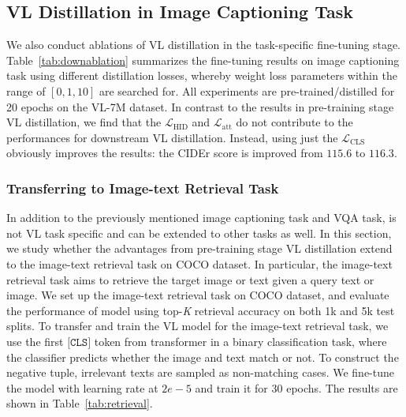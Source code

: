 \subsection*{VL Distillation in Image Captioning Task}
We also conduct ablations of VL distillation in the task-specific fine-tuning stage. Table~\ref{tab:downablation} summarizes the fine-tuning results on image captioning task using different distillation losses, whereby weight loss parameters within the range of $[0, 1, 10]$ are searched for. All experiments are pre-trained/distilled for 20 epochs on the VL-7M dataset. In contrast to the results in pre-training stage VL distillation, we find that the $\mathcal{L}_\text{HID}$ and $\mathcal{L}_\text{att}$ do not contribute to the performances for downstream VL distillation. Instead, using just the $\mathcal{L}_\text{CLS}$ obviously improves the results: the CIDEr score is improved from $115.6$ to $116.3$.



\subsubsection*{Transferring to Image-text Retrieval Task}
In addition to the previously mentioned image captioning task and VQA task, \distillvlm is not VL task specific and can be extended to other tasks as well. In this section, we study whether the advantages from pre-training stage VL distillation extend to the image-text retrieval task on COCO dataset. In particular, the image-text retrieval task aims to retrieve the target image or text given a query text or image. We set up the image-text retrieval task on COCO dataset, and evaluate the performance of model using top-\textit{K} retrieval accuracy on both 1k and 5k test splits. To transfer and train the VL model for the image-text retrieval task, we use the first $\texttt{[CLS]}$ token from transformer in a binary classification task, where the classifier predicts whether the image and text match or not. To construct the negative tuple, irrelevant texts are sampled as non-matching cases. We fine-tune the model with learning rate at $2e-5$ and train it for $30$ epochs. The results are shown in Table~\ref{tab:retrieval}. 




